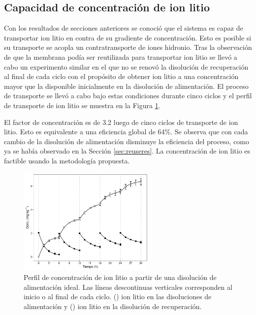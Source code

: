 \subsection{Capacidad de concentración de ion litio}\label{sec:idealconc}
Con los resultados de secciones anteriores se conoció que el sistema es capaz de transportar ion litio en contra de su gradiente de concentración. Esto es posible si su transporte se acopla un contratransporte de iones hidronio. Tras la observación de que la membrana podía ser reutilizada para transportar ion litio se llevó a cabo un experimento similar en el que no se renovó la disolución de recuperación al final de cada ciclo con el propósito de obtener ion litio a una concentración mayor que la disponible inicialmente en la disolución de alimentación. El proceso de transporte se llevó a cabo bajo estas condiciones durante cinco ciclos y el perfil de transporte de ion litio se muestra en la Figura \ref{fig:liconc1}. 

El factor de concentración es de 3.2 luego de cinco ciclos de transporte de ion litio. Esto es equivalente a una eficiencia global de 64\%. Se observa que con cada cambio de la disolución de alimentación disminuye la eficiencia del proceso, como ya se había observado en la Sección \ref{sec:reuseres}. La concentración de ion litio es factible usando la metodología propuesta.

\begin{figure}[H]
    \centering
    \includegraphics[width = 0.6\textwidth]{chap5/figures/liconc_0.pdf}
    \caption[Concentración de ion litio a partir de una disolución de alimentación ideal.]{Perfil de concentración de ion litio a partir de una disolución de alimentación ideal. Las líneas descontinuas verticales corresponden al inicio o al final de cada ciclo. (\protect\squareblck) ion litio en las disoluciones de alimentación y (\protect\squarewht) ion litio en la disolución de recuperación.}
    \label{fig:liconc1}
\end{figure}


